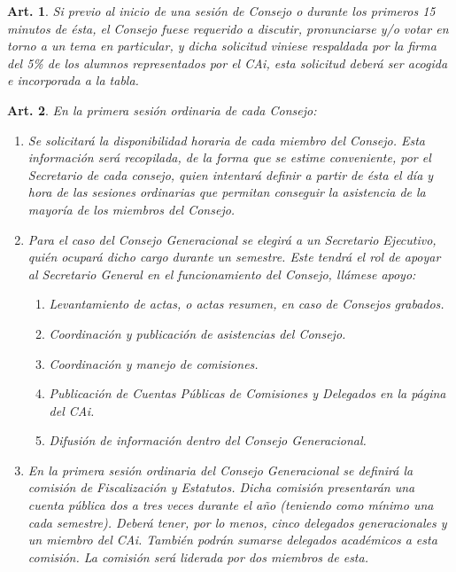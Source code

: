 \documentclass[letterpaper,11pt]{article}
\theoremstyle{plain}
\newtheorem{art}{Art.} %
\begin{document}
			\begin{art}\label{temaPropuestoAlumnado}
				Si previo al inicio de una sesión de Consejo o durante los primeros 15 minutos de ésta, el Consejo fuese requerido a discutir, pronunciarse y/o votar en torno a un tema en particular, y dicha solicitud viniese respaldada por la firma del 5\% de los alumnos representados por el CAi, esta solicitud deberá ser acogida e incorporada a la tabla.
			\end{art}

			\begin{art}\label{fijarAsistencias}
				En la primera sesión ordinaria de cada Consejo:
				\begin{enumerate}
					\item Se solicitará la disponibilidad horaria de cada miembro del Consejo. Esta información será recopilada, de la forma que se estime conveniente, por el Secretario de cada consejo, quien intentará definir a partir de ésta el día y hora de las sesiones ordinarias que permitan conseguir la asistencia de la mayoría de los miembros del Consejo.
					
					\item Para el caso del Consejo Generacional se elegirá a un Secretario Ejecutivo, quién ocupará dicho cargo durante un semestre. Este tendrá el rol de apoyar al Secretario General en el funcionamiento del Consejo, llámese apoyo:
						\begin{enumerate}
							\item Levantamiento de actas, o actas resumen, en caso de Consejos grabados.
							\item Coordinación y publicación de asistencias del Consejo.
							\item Coordinación y manejo de comisiones.
							\item Publicación de Cuentas Públicas de Comisiones y Delegados en la página del CAi.
							\item Difusión de información dentro del Consejo Generacional.
						\end{enumerate}
					
					\item En la primera sesión ordinaria del Consejo Generacional se definirá la comisión de Fiscalización y Estatutos. Dicha comisión presentarán una cuenta pública dos a tres veces durante el año (teniendo como mínimo una cada semestre). Deberá tener, por lo menos, cinco delegados generacionales y un miembro del CAi. También podrán sumarse delegados académicos a esta comisión. La comisión será liderada por dos miembros de esta.
				\end{enumerate}
			\end{art}
\end{document}
